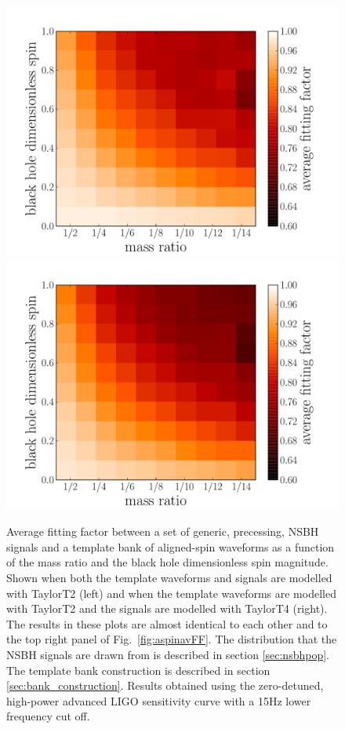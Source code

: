 \begin{figure}
    \centering 
    \begin{minipage}[l]{\columnwidth}
    \centering
\includegraphics[width=1.0\textwidth]
{papers/nsbh_effectualness/figure14A.pdf}
\includegraphics[width=1.0\textwidth]
{papers/nsbh_effectualness/figure14B.pdf}
\caption{\label{fig:aspinavFFT2}
Average fitting factor between a set of generic, precessing, NSBH
signals and a template bank of aligned-spin waveforms as a function of the
mass ratio and the black hole dimensionless spin magnitude. Shown when both the
template waveforms and signals are modelled with TaylorT2 (left) and when the
template waveforms are modelled with TaylorT2 and the signals are modelled with
TaylorT4 (right). The results in these plots are almost identical to each other 
and to the top right panel of Fig.~\ref{fig:aspinavFF}.
The distribution that the NSBH
signals are drawn from is described in section \ref{sec:nsbhpop}. The
template bank construction is described in section \ref{sec:bank_construction}.
Results obtained
using the zero-detuned, high-power advanced LIGO sensitivity curve with a 15Hz
lower frequency cut off.
}
\end{minipage}
\end{figure}

